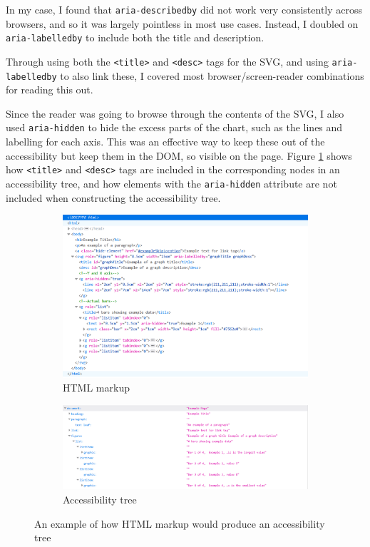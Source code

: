 \documentclass[ %
                    author={Aleena Baig},
                supervisor={Dr Simon Lock},
                    degree={BSc},
                     title={On Making Web Accessible Graphs},
                  subtitle={},
                      year={2019} ]{dissertation}
\begin{document}
In my case, I found that \texttt{aria-describedby} did not work very consistently across browsers, and so it was largely pointless in most use cases. Instead, I doubled on \texttt{aria-labelledby} to include both the title and description.

Through using both the \texttt{<title>} and \texttt{<desc>} tags for the SVG, and using \texttt{aria-labelledby} to also link these, I covered most browser/screen-reader combinations for reading this out.

Since the reader was going to browse through the contents of the SVG, I also used \texttt{aria-hidden} to hide the excess parts of the chart, such as the lines and labelling for each axis. This was an effective way to keep these out of the accessibility but keep them in the DOM, so visible on the page. Figure \ref{fig:HTMLATComparison} shows how \texttt{<title>} and \texttt{<desc>} tags are included in the corresponding nodes in an accessibility tree, and how elements with the \texttt{aria-hidden} attribute are not included when constructing the accessibility tree.

\begin{figure}[h]
  \centering
  \begin{subfigure}[b]{0.8\textwidth}
    \centering
    \includegraphics[width=\linewidth]{images/ExampleHTML.PNG}
     \caption{HTML markup}
  \end{subfigure}
  \begin{subfigure}[b]{0.8\textwidth}
    \centering
    \includegraphics[width=\linewidth]{images/ExampleAccessibilityTree.PNG}
    \caption{Accessibility tree}
  \end{subfigure}
  \caption{An example of how HTML markup would produce an accessibility tree}
  \label{fig:HTMLATComparison}
\end{figure}
\end{document}
